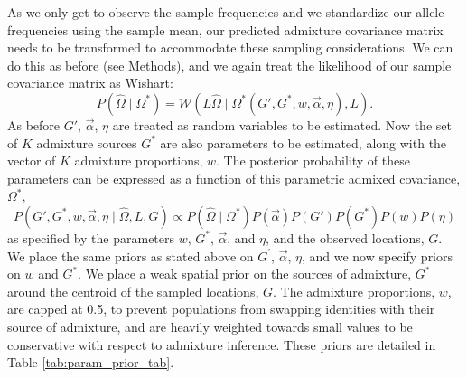 \documentclass[12pt]{article}
\newcommand{\identifyadmixsource}[1]{{#1^{*}}}
\begin{document}
As we only get to observe the sample frequencies and we standardize our allele frequencies using the sample mean, our predicted admixture covariance matrix needs to be transformed to accommodate these sampling considerations. We can do this as before (see Methods), and we again treat the likelihood of our sample covariance matrix as Wishart:
\begin{equation}
\label{eq:wishart_dist_admixed}
P(\widehat{\Omega} \mid \identifyadmixsource{\Omega}) = 
	\mathcal{W}\left(L \widehat{\Omega} \mid \identifyadmixsource{\Omega} \left( G',\identifyadmixsource{G}, w,\vec{\alpha},\eta \right),L \right)	\text{.}
\end{equation}
As before $G'$, $\vec{\alpha}$, $\eta$ are treated as random variables to be estimated. Now the set of $K$ admixture sources $\identifyadmixsource{G}$ are also parameters to be estimated, along with the vector of $K$ admixture proportions, $w$. The posterior probability of these parameters can be expressed as a function of this parametric admixed covariance, $\identifyadmixsource{\Omega}$,
\begin{equation}
\label{eq:admixed_post_prob}
P(G',\identifyadmixsource{G}, w,\vec{\alpha}, \eta \mid \widehat{\Omega}, L,G) 
	\propto  
		P(\widehat{\Omega}  \mid \identifyadmixsource{\Omega}) P(\vec{\alpha}) P(G') P(\identifyadmixsource{G}) P(w) P(\eta) 
\end{equation}
%
as specified by the parameters $w$, $\identifyadmixsource{G}$, $\vec{\alpha}$, and $\eta$, and the observed locations, $G$.  We place the same priors as stated above on $G^{\prime}$, $\vec{\alpha}$, $\eta$, and we now specify priors on $w$ and $\identifyadmixsource{G}$.  We place a weak spatial prior on the sources of admixture, $\identifyadmixsource{G}$ around the centroid of the sampled locations, $G$. The admixture proportions, $w$, are capped at 0.5, to prevent populations from swapping identities with their source of admixture, and are heavily weighted towards small values to be conservative with respect to admixture inference.  These priors are detailed in Table \ref{tab:param_prior_tab}.
\end{document}
